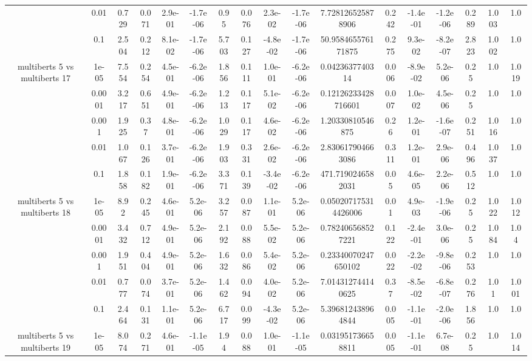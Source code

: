 \begin{tabular}{|c|c|c|c|c|c|c|c|c|c|c|c|c|c|c|c|c|}
 & 0.01 & 0.729 & 0.071 & 2.9e-01 & -1.7e-06 & 0.95 & 0.076 & 2.3e-02 & -1.7e-06 & 7.728126525878906 & 0.242 & -1.4e-01 & -1.2e-06 & 0.289 & 1.003 & 1.0 \\
 & 0.1 & 2.504 & 0.212 & 8.1e-02 & -1.7e-06 & 5.703 & 0.127 & -4.8e-02 & -1.7e-06 & 50.958465576171875 & 0.275 & 9.3e-02 & -8.2e-07 & 2.823 & 1.002 & 1.0 \\
\hline
\multirow{5}{*}{multiberts 5 vs multiberts 17} & 1e-05 & 7.554 & 0.254 & 4.5e-01 & -6.2e-06 & 1.856 & 0.111 & 1.0e-01 & -6.2e-06 & 0.0423637740314 & 0.006 & -8.9e-02 & 5.2e-06 & 0.25 & 1.0 & 1.019 \\
 & 0.0001 & 3.217 & 0.651 & 4.9e-01 & -6.2e-06 & 1.213 & 0.117 & 5.1e-02 & -6.2e-06 & 0.12126233428716601 & 0.007 & 1.0e-02 & 4.5e-06 & 0.25 & 1.0 & 1.0 \\
 & 0.001 & 1.925 & 0.37 & 4.8e-01 & -6.2e-06 & 1.029 & 0.117 & 4.6e-02 & -6.2e-06 & 1.20330810546875 & 0.26 & 1.2e-01 & -1.6e-07 & 0.251 & 1.016 & 1.0 \\
 & 0.01 & 1.067 & 0.126 & 3.7e-01 & -6.2e-06 & 1.903 & 0.331 & 2.6e-02 & -6.2e-06 & 2.830617904663086 & 0.311 & 1.2e-01 & 2.9e-06 & 0.496 & 1.037 & 1.0 \\
 & 0.1 & 1.858 & 0.182 & 1.9e-01 & -6.2e-06 & 3.371 & 0.139 & -3.4e-02 & -6.2e-06 & 471.7190246582031 & 0.05 & 4.6e-05 & 2.2e-06 & 0.512 & 1.0 & 1.0 \\
\hline
\multirow{5}{*}{multiberts 5 vs multiberts 18} & 1e-05 & 8.92 & 0.245 & 4.6e-01 & 5.2e-06 & 3.257 & 0.087 & 1.1e-01 & 5.2e-06 & 0.050207175314426006 & 0.01 & 4.9e-03 & -1.9e-06 & 0.25 & 1.022 & 1.012 \\
 & 0.0001 & 3.432 & 0.712 & 4.9e-01 & 5.2e-06 & 2.192 & 0.088 & 5.5e-02 & 5.2e-06 & 0.782406568527221 & 0.122 & -2.4e-01 & 3.0e-06 & 0.25 & 1.084 & 1.04 \\
 & 0.001 & 1.951 & 0.404 & 4.9e-01 & 5.2e-06 & 1.632 & 0.086 & 5.4e-02 & 5.2e-06 & 0.23340070247650102 & 0.022 & -2.2e-02 & -9.8e-06 & 0.253 & 1.0 & 1.0 \\
 & 0.01 & 0.777 & 0.074 & 3.7e-01 & 5.2e-06 & 1.462 & 0.094 & 4.0e-02 & 5.2e-06 & 7.014312744140625 & 0.37 & -8.5e-02 & -6.8e-07 & 0.276 & 1.01 & 1.001 \\
 & 0.1 & 2.464 & 0.131 & 1.1e-01 & 5.2e-06 & 6.717 & 0.099 & -4.3e-02 & 5.2e-06 & 5.396812438964844 & 0.005 & -1.1e-01 & -2.0e-06 & 1.856 & 1.0 & 1.0 \\
\hline
\multirow{5}{*}{multiberts 5 vs multiberts 19} & 1e-05 & 8.074 & 0.271 & 4.6e-01 & -1.1e-05 & 1.94 & 0.088 & 1.0e-01 & -1.1e-05 & 0.031951736658811 & 0.005 & -1.1e-01 & 6.7e-08 & 0.25 & 1.0 & 1.014 \\

\end{tabular}
